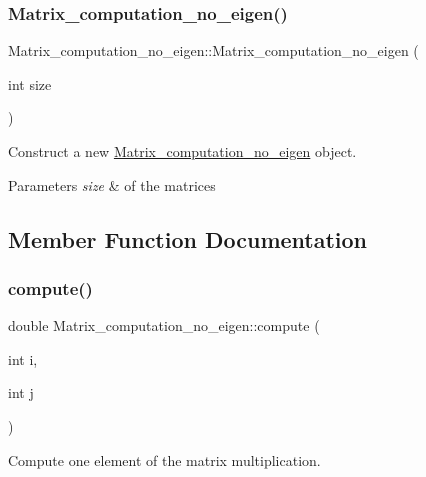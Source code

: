 \subsubsection{\texorpdfstring{Matrix\+\_\+computation\+\_\+no\+\_\+eigen()}{Matrix\_computation\_no\_eigen()}}
{\footnotesize\ttfamily Matrix\+\_\+computation\+\_\+no\+\_\+eigen\+::\+Matrix\+\_\+computation\+\_\+no\+\_\+eigen (\begin{DoxyParamCaption}\item[{int}]{size }\end{DoxyParamCaption})\hspace{0.3cm}{\ttfamily [inline]}}



Construct a new \hyperlink{classMatrix__computation__no__eigen}{Matrix\+\_\+computation\+\_\+no\+\_\+eigen} object. 


\begin{DoxyParams}{Parameters}
{\em size} & of the matrices \\
\hline
\end{DoxyParams}


\subsection{Member Function Documentation}
\mbox{\label{classMatrix__computation__no__eigen_a588b833136c503e9726d7276f358f117}} 
\subsubsection{\texorpdfstring{compute()}{compute()}\hspace{0.1cm}{\footnotesize\ttfamily [1/2]}}
{\footnotesize\ttfamily double Matrix\+\_\+computation\+\_\+no\+\_\+eigen\+::compute (\begin{DoxyParamCaption}\item[{int}]{i,  }\item[{int}]{j }\end{DoxyParamCaption})\hspace{0.3cm}{\ttfamily [inline]}}



Compute one element of the matrix multiplication. 


